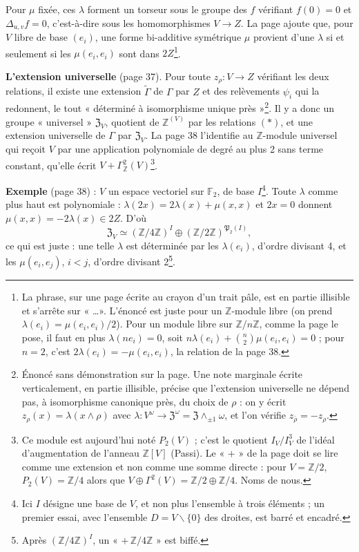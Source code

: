 \documentclass[11pt,a4paper]{article}
\begin{document}
Pour $\mu$ fixée, ces $\lambda$ forment un torseur sous le groupe des $f$
vérifiant $f(0) = 0$ et $\Delta_{u,v} f = 0$, c'est-à-dire sous les
homomorphismes $V \to Z$. La page ajoute que, pour $V$ libre de base $(e_i)$,
une forme bi-additive symétrique $\mu$ provient d'une $\lambda$ si et seulement
si les $\mu(e_i, e_i)$ sont dans $2Z$\footnote{La phrase, sur une page écrite au
crayon d'un trait pâle, est en partie illisible et s'arrête sur « \ldots ».
L'énoncé est juste pour un $\mathbb{Z}$-module libre (on prend $\lambda(e_i) =
\mu(e_i, e_i)/2$). Pour un module libre sur $\mathbb{Z}/n\mathbb{Z}$, comme la
page le pose, il faut en plus $\lambda(n e_i) = 0$, soit $n\lambda(e_i) +
\binom{n}{2}\mu(e_i, e_i) = 0$ ; pour $n = 2$, c'est $2\lambda(e_i) = -\mu(e_i,
e_i)$, la relation de la page 38.}.

\textbf{L'extension universelle} (page 37). Pour toute $z_\rho : V \to Z$
vérifiant les deux relations, il existe une extension $\widetilde\Gamma$ de
$\Gamma$ par $Z$ et des relèvements $\psi_i$ qui la redonnent, le tout
« déterminé à isomorphisme unique près »\footnote{Énoncé sans démonstration
sur la page. Une note marginale écrite verticalement, en partie illisible,
précise que l'extension universelle ne dépend pas, à isomorphisme canonique
près, du choix de $\rho$ : on y écrit $z_\rho(x) = \lambda(x \wedge \rho)$
avec $\lambda : V^\omega \to \mathfrak{Z}^\omega = \mathfrak{Z} \wedge_{\pm 1}
\omega$, et l'on vérifie $z_{\bar\rho} = -z_\rho$.}. Il y a donc un groupe
« universel » $\mathfrak{Z}_V$, quotient de $\mathbb{Z}^{(V)}$ par les
relations $(*)$, et une extension universelle de $\Gamma$ par
$\mathfrak{Z}_V$. La page 38 l'identifie au $\mathbb{Z}$-module universel qui
reçoit $V$ par une application polynomiale de degré au plus 2 sans terme
constant, qu'elle écrit $V + \Gamma^2_{\mathbb{Z}}(V)$\footnote{Ce module est
aujourd'hui noté $P_2(V)$ ; c'est le quotient $I_V / I_V^3$ de l'idéal
d'augmentation de l'anneau $\mathbb{Z}[V]$ (Passi). Le « $+$ » de la page doit
se lire comme une extension et non comme une somme directe : pour $V =
\mathbb{Z}/2$, $P_2(V) = \mathbb{Z}/4$ alors que $V \oplus \Gamma^2(V) =
\mathbb{Z}/2 \oplus \mathbb{Z}/4$. Noms de nous.}.

\textbf{Exemple} (page 38) : $V$ un espace vectoriel sur $\mathbb{F}_2$, de
base $I$\footnote{Ici $I$ désigne une base de $V$, et non plus l'ensemble à
trois éléments ; un premier essai, avec l'ensemble $D = V \smallsetminus
\lbrace 0\rbrace$ des droites, est barré et encadré.}. Toute $\lambda$ comme
plus haut est polynomiale : $\lambda(2x) = 2\lambda(x) + \mu(x, x)$ et $2x = 0$
donnent $\mu(x, x) = -2\lambda(x) \in 2Z$. D'où
\[
\mathfrak{Z}_V \simeq (\mathbb{Z}/4\mathbb{Z})^I \oplus
(\mathbb{Z}/2\mathbb{Z})^{\mathfrak{P}_2(I)} ,
\]
ce qui est juste : une telle $\lambda$ est déterminée par les $\lambda(e_i)$,
d'ordre divisant 4, et les $\mu(e_i, e_j)$, $i < j$, d'ordre divisant
2\footnote{Après $(\mathbb{Z}/4\mathbb{Z})^I$, un « $+\,\mathbb{Z}/4\mathbb{Z}$ »
est biffé.}.
\end{document}
